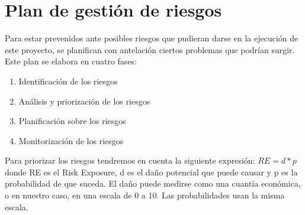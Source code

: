 \documentclass[openright,twoside,12pt]{book}
\begin{document}
\section{Plan de gestión de riesgos}

Para estar prevenidos ante posibles riesgos que pudieran darse en la ejecución de este proyecto, se planifican con antelación ciertos problemas que podrían surgir. Este plan se elabora en cuatro fases:
\begin{enumerate}
    \item Identificación de los riesgos
    \item Análisis y priorización de los riesgos
    \item Planificación sobre los riesgos
    \item Monitorización de los riesgos
\end{enumerate}

Para priorizar los riesgos tendremos en cuenta la siguiente expresión:
\begin{math}
RE = d*p
\end{math}
donde RE es el Risk Exposure, d es el daño potencial que puede causar y p es la probabilidad de que suceda. El daño puede medirse como una cuantía económica, o en nuestro caso, en una escala de 0 a 10. Las probabilidades usan la misma escala.
\end{document}
